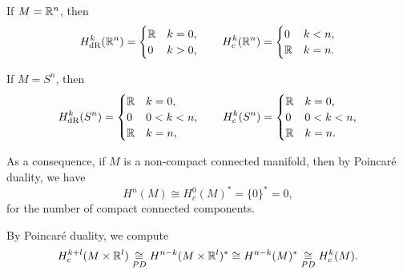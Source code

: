 \begin{example}
    If \(M = \mathbb{R}^n\), then \[
        H_{\mathrm{dR}}^k(\mathbb{R}^n) = \begin{cases}
            \mathbb{R} & k = 0,\\
            0 & k > 0,
        \end{cases}
        \qquad
        H_c^k(\mathbb{R}^n) = \begin{cases}
            0 & k < n,\\
            \mathbb{R} & k = n.
        \end{cases}
    \]
\end{example}

\begin{example}
    If \(M = S^n\), then \[
        H_{\mathrm{dR}}^k(S^n) = \begin{cases}
            \mathbb{R} & k = 0, \\
            0 & 0 < k < n, \\
            \mathbb{R} & k = n,
        \end{cases}
        \qquad
        H_c^k(S^n) = \begin{cases}
            \mathbb{R} & k = 0, \\
            0 & 0 < k < n, \\
            \mathbb{R} & k = n.
        \end{cases}
    \]
\end{example}

As a consequence, if \(M\) is a non-compact connected manifold, then by Poincar\'e duality, we have \[
    H^n(M) \cong H_c^0(M)^* = \{0\}^* = 0,
\] for the number of compact connected components.

\begin{example}
    By Poincar\'e duality, we compute \begin{align*}
        H_c^{k+l}(M\times\mathbb{R}^l)
        \underset{PD}{\cong} H^{n-k}(M\times\mathbb{R}^l)^*
        \cong H^{n-k}(M)^*
        \underset{PD}{\cong} H_c^k(M).
    \end{align*}
\end{example}

